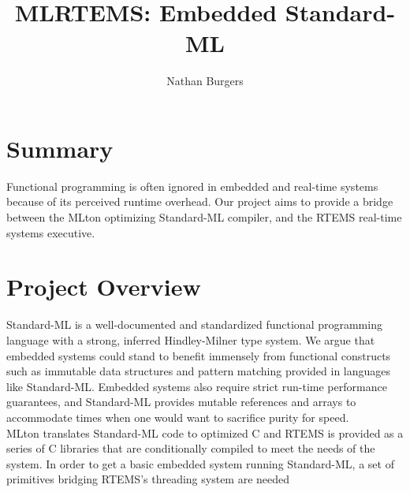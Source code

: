 \documentclass[12pt]{article}
\title{MLRTEMS: Embedded Standard-ML}
\author{Nathan Burgers}
\begin{document}
\maketitle

\section{Summary}
Functional programming is often ignored in embedded and real-time systems because of its perceived runtime overhead. Our project aims to provide a bridge between the MLton optimizing Standard-ML compiler, and the RTEMS real-time systems executive.

\section{Project Overview}
Standard-ML is a well-documented and standardized functional programming language with a strong, inferred Hindley-Milner type system. We argue that embedded systems could stand to benefit immensely from functional constructs such as immutable data structures and pattern matching provided in languages like Standard-ML. Embedded systems also require strict run-time performance guarantees, and Standard-ML provides mutable references and arrays to accommodate times when one would want to sacrifice purity for speed.\\
\indent MLton translates Standard-ML code to optimized C and RTEMS is provided as a series of C libraries that are conditionally compiled to meet the needs of the system. In order to get a basic embedded system running Standard-ML, a set of primitives bridging RTEMS's threading system are needed
\end{document}
